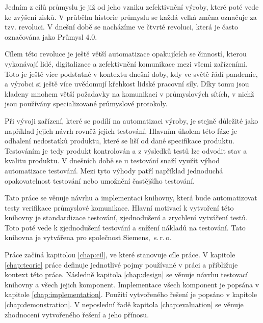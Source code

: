 \begin{introduction}

Jedním z cílů průmyslu je již od jeho vzniku zefektivnění výroby, které poté vede ke zvýšení zisků. V průběhu historie průmyslu se každá velká změna označuje za tzv. revoluci. V dnešní době se nacházíme ve čtvrté revoluci, která je často označována jako Průmysl 4.0. 
    
Cílem této revoluce je ještě větší automatizace opakujících se činností, kterou vykonávají lidé, digitalizace a zefektivnění komunikace mezi všemi zařízeními. Toto je ještě více podstatné v kontextu dnešní doby, kdy ve světě řádí pandemie, a výrobci si ještě více uvědomují křehkost lidské pracovní síly. Díky tomu jsou kladeny mnohem větší požadavky na komunikaci v průmyslových sítích, v nichž jsou používány specializované průmyslové protokoly. 
    
Při vývoji zařízení, které se podílí na automatizaci výroby, je stejně důležité jako například jejich návrh rovněž jejich testování. Hlavním úkolem této fáze je odhalení nedostatků produktu, které se liší od dané specifikace produktu. Testováním je tedy produkt kontrolován a z výsledků testů lze odvodit stav a kvalitu produktu. V dnešních době se u testování snaží využít výhod automatizace testování. Mezi tyto výhody patří například jednoduchá opakovatelnost testování nebo umožnění častějšího testování. 
    
Tato práce se věnuje návrhu a implementaci knihovny, která bude automatizovat testy verifikace průmyslové komunikace. Hlavní motivací k vytvoření této knihovny je standardizace testování, zjednodušení a zrychlení vytváření testů. Toto poté vede k zjednodušení testování a snížení nákladů na testování. Tato knihovna je vytvářena pro společnost Siemens,~s.\,{}r.\,{}o.
    
Práce začíná kapitolou \ref{chap:cil}, ve které stanovuje cíle práce. V kapitole \ref{chap:teorie} práce definuje jednotlivé pojmy používané v práci a přibližuje kontext této práce. Následně kapitola \ref{chap:design} se věnuje návrhu testovací knihovny a všech jejich komponent. Implementace všech komponent je popsána v kapitole \ref{chap:implementation}. Použití vytvořeného řešení je popsáno v kapitole \ref{chap:demonstration}. V neposlední řadě kapitola \ref{chap:evaluation} se věnuje zhodnocení vytvořeného řešení a jeho přínosu.
\end{introduction}